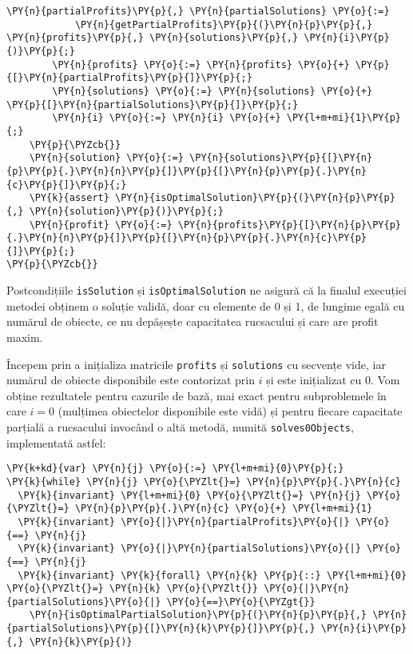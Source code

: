 \begin{sloppypar}
\begin{Verbatim}[commandchars=\\\{\}]
        \PY{n}{partialProfits}\PY{p}{,} \PY{n}{partialSolutions} \PY{o}{:=} 
            \PY{n}{getPartialProfits}\PY{p}{(}\PY{n}{p}\PY{p}{,} \PY{n}{profits}\PY{p}{,} \PY{n}{solutions}\PY{p}{,} \PY{n}{i}\PY{p}{)}\PY{p}{;}
        \PY{n}{profits} \PY{o}{:=} \PY{n}{profits} \PY{o}{+} \PY{p}{[}\PY{n}{partialProfits}\PY{p}{]}\PY{p}{;}
        \PY{n}{solutions} \PY{o}{:=} \PY{n}{solutions} \PY{o}{+} \PY{p}{[}\PY{n}{partialSolutions}\PY{p}{]}\PY{p}{;}
        \PY{n}{i} \PY{o}{:=} \PY{n}{i} \PY{o}{+} \PY{l+m+mi}{1}\PY{p}{;} 
    \PY{p}{\PYZcb{}}
    \PY{n}{solution} \PY{o}{:=} \PY{n}{solutions}\PY{p}{[}\PY{n}{p}\PY{p}{.}\PY{n}{n}\PY{p}{]}\PY{p}{[}\PY{n}{p}\PY{p}{.}\PY{n}{c}\PY{p}{]}\PY{p}{;}
    \PY{k}{assert} \PY{n}{isOptimalSolution}\PY{p}{(}\PY{n}{p}\PY{p}{,} \PY{n}{solution}\PY{p}{)}\PY{p}{;}
    \PY{n}{profit} \PY{o}{:=} \PY{n}{profits}\PY{p}{[}\PY{n}{p}\PY{p}{.}\PY{n}{n}\PY{p}{]}\PY{p}{[}\PY{n}{p}\PY{p}{.}\PY{n}{c}\PY{p}{]}\PY{p}{;}
\PY{p}{\PYZcb{}}
\end{Verbatim}
    \par Postcondițiile \texttt{isSolution} și \texttt{isOptimalSolution} ne asigură că la finalul execuției metodei obținem o soluție validă, doar cu elemente de 0 și 1, de lungime egală cu numărul de obiecte, ce nu depășește capacitatea rucsacului și care are profit maxim.
    \par Începem prin a inițializa matricile \texttt{profits} și \texttt{solutions} cu secvențe vide, iar numărul de obiecte disponibile este contorizat prin $i$ și este inițializat cu 0. Vom obține rezultatele pentru cazurile de bază, mai exact pentru subproblemele în care $i = 0$ (mulțimea obiectelor disponibile este vidă) și pentru fiecare capacitate parțială a rucsacului invocând o altă metodă, 
    numită \texttt{solves0Objects}, implementată astfel: 
    \begin{Verbatim}[commandchars=\\\{\}]
\PY{k+kd}{var} \PY{n}{j} \PY{o}{:=} \PY{l+m+mi}{0}\PY{p}{;}
\PY{k}{while} \PY{n}{j} \PY{o}{\PYZlt{}=} \PY{n}{p}\PY{p}{.}\PY{n}{c}
  \PY{k}{invariant} \PY{l+m+mi}{0} \PY{o}{\PYZlt{}=} \PY{n}{j} \PY{o}{\PYZlt{}=} \PY{n}{p}\PY{p}{.}\PY{n}{c} \PY{o}{+} \PY{l+m+mi}{1}
  \PY{k}{invariant} \PY{o}{|}\PY{n}{partialProfits}\PY{o}{|} \PY{o}{==} \PY{n}{j}
  \PY{k}{invariant} \PY{o}{|}\PY{n}{partialSolutions}\PY{o}{|} \PY{o}{==} \PY{n}{j}
  \PY{k}{invariant} \PY{k}{forall} \PY{n}{k} \PY{p}{::} \PY{l+m+mi}{0} \PY{o}{\PYZlt{}=} \PY{n}{k} \PY{o}{\PYZlt{}} \PY{o}{|}\PY{n}{partialSolutions}\PY{o}{|} \PY{o}{==}\PY{o}{\PYZgt{}} 
    \PY{n}{isOptimalPartialSolution}\PY{p}{(}\PY{n}{p}\PY{p}{,} \PY{n}{partialSolutions}\PY{p}{[}\PY{n}{k}\PY{p}{]}\PY{p}{,} \PY{n}{i}\PY{p}{,} \PY{n}{k}\PY{p}{)}

\end{Verbatim}
\end{sloppypar}
